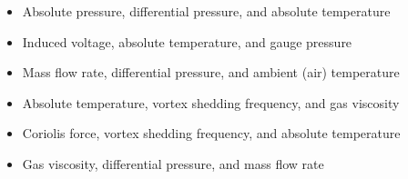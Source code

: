 \begin{itemize}
\item{} Absolute pressure, differential pressure, and absolute temperature
\vskip 5pt 
\item{} Induced voltage, absolute temperature, and gauge pressure
\vskip 5pt 
\item{} Mass flow rate, differential pressure, and ambient (air) temperature
\vskip 5pt 
\item{} Absolute temperature, vortex shedding frequency, and gas viscosity 
\vskip 5pt 
\item{} Coriolis force, vortex shedding frequency, and absolute temperature
\vskip 5pt 
\item{} Gas viscosity, differential pressure, and mass flow rate
\end{itemize}





